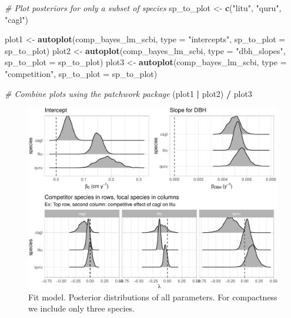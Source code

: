 \documentclass[12pt]{article}
\newenvironment{Shaded}{\begin{snugshade}}{\end{snugshade}}
\newcommand{\CommentTok}[1]{\textcolor[rgb]{0.56,0.35,0.01}{\textit{#1}}}
\newcommand{\DataTypeTok}[1]{\textcolor[rgb]{0.13,0.29,0.53}{#1}}
\newcommand{\KeywordTok}[1]{\textcolor[rgb]{0.13,0.29,0.53}{\textbf{#1}}}
\newcommand{\NormalTok}[1]{#1}
\newcommand{\OperatorTok}[1]{\textcolor[rgb]{0.81,0.36,0.00}{\textbf{#1}}}
\newcommand{\StringTok}[1]{\textcolor[rgb]{0.31,0.60,0.02}{#1}}
\begin{document}
\begin{Shaded}
\begin{Highlighting}[]
\CommentTok{# Plot posteriors for only a subset of species}
\NormalTok{sp_to_plot <-}\StringTok{ }\KeywordTok{c}\NormalTok{(}\StringTok{"litu"}\NormalTok{, }\StringTok{"quru"}\NormalTok{, }\StringTok{"cagl"}\NormalTok{)}

\NormalTok{plot1 <-}\StringTok{ }\KeywordTok{autoplot}\NormalTok{(comp_bayes_lm_scbi, }\DataTypeTok{type =} \StringTok{"intercepts"}\NormalTok{, }
                  \DataTypeTok{sp_to_plot =}\NormalTok{ sp_to_plot)}
\NormalTok{plot2 <-}\StringTok{ }\KeywordTok{autoplot}\NormalTok{(comp_bayes_lm_scbi, }\DataTypeTok{type =} \StringTok{"dbh_slopes"}\NormalTok{, }
                  \DataTypeTok{sp_to_plot =}\NormalTok{ sp_to_plot)}
\NormalTok{plot3 <-}\StringTok{ }\KeywordTok{autoplot}\NormalTok{(comp_bayes_lm_scbi, }\DataTypeTok{type =} \StringTok{"competition"}\NormalTok{, }
                  \DataTypeTok{sp_to_plot =}\NormalTok{ sp_to_plot)}

\CommentTok{# Combine plots using the patchwork package}
\NormalTok{(plot1 }\OperatorTok{|}\StringTok{ }\NormalTok{plot2) }\OperatorTok{/}\StringTok{ }\NormalTok{plot3}
\end{Highlighting}
\end{Shaded}

\begin{figure}

{\centering \includegraphics[width=1\linewidth]{Figures/scbi-posterior-viz-1} 

}

\caption{Fit model. Posterior distributions of all parameters. For compactness we include only three species.}\label{fig:scbi-posterior-viz}
\end{figure}
\end{document}
